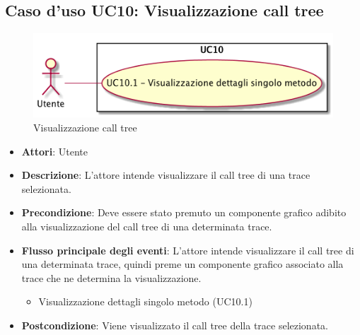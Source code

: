 \subsection{Caso d'uso UC10: Visualizzazione call tree}
\begin{figure} [H]
	\centering
	\includegraphics[scale=0.45]{./UC/UC10.png}
	\caption{Visualizzazione call tree}\label{}
\end{figure}
\begin{itemize}
	\item \textbf{Attori}: Utente
	\item \textbf{Descrizione}: L'attore intende visualizzare il call tree di una trace selezionata.
	\item \textbf{Precondizione}: Deve essere stato premuto un componente grafico adibito alla visualizzazione del call tree di una determinata trace.
	\item \textbf{Flusso principale degli eventi}: L'attore intende visualizzare il call tree di una determinata trace, quindi preme un componente grafico associato alla trace che ne determina la visualizzazione.
	\begin{itemize}
		\item Visualizzazione dettagli singolo metodo (UC10.1)
	\end{itemize}
	\item \textbf{Postcondizione}: Viene visualizzato il call tree della trace selezionata.
\end{itemize}

 \hypertarget{UC10.1}{}
